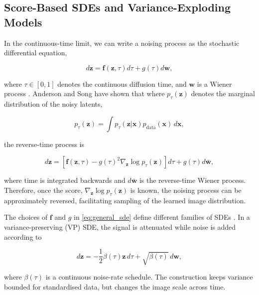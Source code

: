 \subsection{Score-Based SDEs and Variance-Exploding Models}
\label{sec:score_based_sdes}

In the continuous-time limit, we can write a noising process as the stochastic differential equation,

\begin{equation}
d\mathbf{z}=\mathbf{f}(\mathbf{z},\tau)d\tau+g(\tau)d\mathbf{w},
\label{eq:general_sde}
\end{equation}

where $\tau\in [0,1]$ denotes the continuous diffusion time, and $\mathbf{w}$ is a Wiener process \cite{}. Anderson and Song \cite{} have shown that where $p_\tau(\mathbf{z})$ denotes the marginal distribution of the noisy latents,

\begin{equation}
p_\tau(\mathbf{z})=\int p_\tau (\mathbf{z}|\mathbf{x})p_{\mathrm{data}}(\mathbf{x})\, d\mathbf{x},
\label{eq:marginal}
\end{equation}

the reverse-time process is

\begin{equation}
d\mathbf{z}=\left[\mathbf{f}(\mathbf{z},\tau)-g(\tau)^2\nabla_{\mathbf{z}}\log p_\tau(\mathbf{z})\right]d\tau+g(\tau)d\bar{\mathbf{w}},
\label{eq:reverse_time_sde}
\end{equation}

where time is integrated backwards and $d\bar {\mathbf{w}}$ is the reverse-time Wiener process. Therefore, once the score, $\nabla_\mathbf{z} \log p_\tau(\mathbf{z})$ is known, the noising process can be approximately reversed, facilitating sampling of the learned image distribution.

The choices of $\mathbf{f}$ and $g$ in \eqref{eq:general_sde} define different families of SDEs \cite{}. In a variance-preserving (VP) SDE, the signal is attenuated while noise is added according to

\begin{equation}
d\mathbf{z}=-\frac{1}{2}\beta(\tau)\mathbf{z}\,d\tau+\sqrt{\beta(\tau)}\,d\mathbf{w},
\label{eq:vp_sde}
\end{equation}

where $\beta(\tau)$ is a continuous noise-rate schedule. The construction keeps variance bounded for standardised data, but changes the image scale across time.

